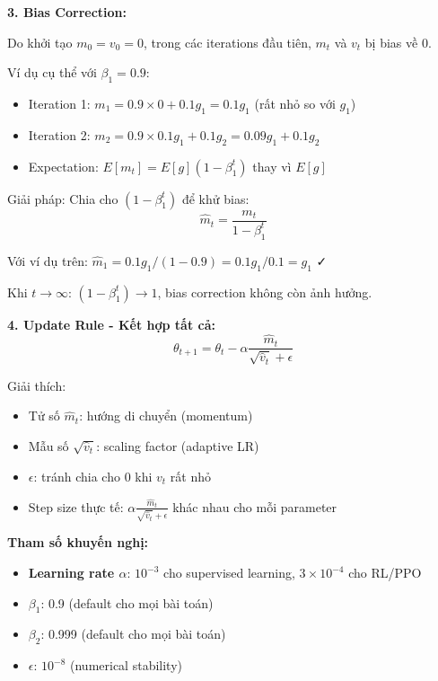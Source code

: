 \textbf{3. Bias Correction:}

Do khởi tạo $m_0 = v_0 = 0$, trong các iterations đầu tiên, $m_t$ và $v_t$ bị bias về 0.

Ví dụ cụ thể với $\beta_1 = 0.9$:
\begin{itemize}[nosep]
\item Iteration 1: $m_1 = 0.9 \times 0 + 0.1 g_1 = 0.1 g_1$ (rất nhỏ so với $g_1$)
\item Iteration 2: $m_2 = 0.9 \times 0.1g_1 + 0.1g_2 = 0.09g_1 + 0.1g_2$
\item Expectation: $E[m_t] = E[g](1 - \beta_1^t)$ thay vì $E[g]$
\end{itemize}

Giải pháp: Chia cho $(1 - \beta_1^t)$ để khử bias:
\begin{equation}
\hat{m}_t = \frac{m_t}{1 - \beta_1^t}
\end{equation}

Với ví dụ trên: $\hat{m}_1 = 0.1g_1 / (1-0.9) = 0.1g_1 / 0.1 = g_1$ ✓

Khi $t \to \infty$: $(1 - \beta_1^t) \to 1$, bias correction không còn ảnh hưởng.

\textbf{4. Update Rule - Kết hợp tất cả:}
\begin{equation}
\theta_{t+1} = \theta_t - \alpha \frac{\hat{m}_t}{\sqrt{\hat{v}_t} + \epsilon}
\end{equation}

Giải thích:
\begin{itemize}[nosep]
\item Tử số $\hat{m}_t$: hướng di chuyển (momentum)
\item Mẫu số $\sqrt{\hat{v}_t}$: scaling factor (adaptive LR)
\item $\epsilon$: tránh chia cho 0 khi $v_t$ rất nhỏ
\item Step size thực tế: $\alpha \frac{\hat{m}_t}{\sqrt{\hat{v}_t} + \epsilon}$ khác nhau cho mỗi parameter
\end{itemize}

\textbf{Tham số khuyến nghị:}
\begin{itemize}[nosep]
\item \textbf{Learning rate $\alpha$}: $10^{-3}$ cho supervised learning, $3 \times 10^{-4}$ cho RL/PPO
\item \textbf{$\beta_1$}: 0.9 (default cho mọi bài toán)
\item \textbf{$\beta_2$}: 0.999 (default cho mọi bài toán)
\item \textbf{$\epsilon$}: $10^{-8}$ (numerical stability)
\end{itemize}

